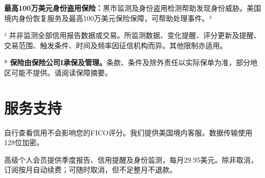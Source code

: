 \documentclass[UTF8,fontset=none,11pt,a4paper]{ctexart}
\begin{document}
\textbf{最高100万美元身份盗用保险：}黑市监测及身份盗用检测帮助发现身份威胁。美国境内身份恢复服务及最高100万美元保险保障，可帮助处理事件。³


² 并非监测全部信用报告数据或交易。所监测数据、变化提醒、评分更新及提醒、交易范围、触发条件、时间及频率因征信机构而异。其他限制亦适用。


\textbf{³ 保险由保险公司I承保及管理。}条款、条件及除外责任以实际保单为准，部分地区可能不提供。请阅读保障摘要。


\section*{服务支持}
自行查看信用不会影响您的FICO评分。我们提供美国境内客服。数据传输使用128位加密。


高级个人会员提供季度报告、信用提醒及身份监测，每月29.95美元。除非取消，订阅按月自动续费；可随时取消，但不足整月不退款。
\end{document}
